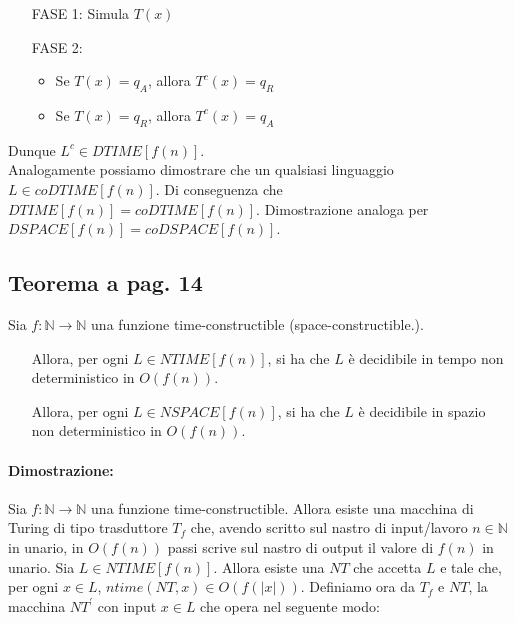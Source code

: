 \begin{enumerate}
    \item [FASE 1:] Simula $T(x)$
    \item [FASE 2:]{
        \begin{itemize}
            \item Se $T(x) = q_{A}$, allora $T^{c}(x) = q_{R}$
            \item Se $T(x) = q_{R}$, allora $T^{c}(x) = q_{A}$
        \end{itemize}
    }
\end{enumerate}
Dunque $L^{c} \in DTIME[f(n)]$.\\
Analogamente possiamo dimostrare che un qualsiasi linguaggio $L \in coDTIME[f(n)]$. Di conseguenza che $DTIME[f(n)] = coDTIME[f(n)]$.
Dimostrazione analoga per $DSPACE[f(n)] = coDSPACE[f(n)]$.
\newpage
\subsection{Teorema a pag. 14}

Sia $f: \mathbb{N} \rightarrow \mathbb{N}$ una funzione time-constructible (space-constructible.).
\begin{itemize}
    \item []{
        Allora, per ogni $L \in NTIME[f(n)]$, si ha che $L$ è decidibile in tempo non deterministico in $O(f(n))$.
    }
    \item []{
        Allora, per ogni $L \in NSPACE[f(n)]$, si ha che $L$ è decidibile in spazio non deterministico in $O(f(n))$.
    }
\end{itemize}

\paragraph*{Dimostrazione:} Sia $f: \mathbb{N} \rightarrow \mathbb{N}$ una funzione time-constructible. Allora esiste
una macchina di Turing di tipo trasduttore $T_{f}$ che, avendo scritto sul nastro di input/lavoro $n \in \mathbb{N}$ in 
unario, in $O(f(n))$ passi scrive sul nastro di output il valore di $f(n)$ in unario. Sia $L \in NTIME[f(n)]$. Allora 
esiste una $NT$ che accetta $L$ e tale che, per ogni $x \in L$, $ntime(NT, x) \in O(f(|x|))$. Definiamo ora da $T_{f}$
e $NT$, la macchina $NT^{'}$ con input $x \in L$ che opera nel seguente modo:

